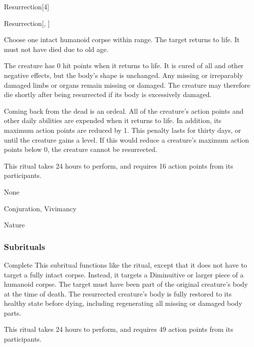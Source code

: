 \begin{spellsection}{Resurrection}[4]


\begin{ability}{Resurrection}[, ]

Choose one intact humanoid corpse within \rngclose range.
The target returns to life.
It must not have died due to old age.

The creature has 0 hit points when it returns to life.
It is cured of all  and other negative effects, but the body's shape is unchanged.
Any missing or irreparably damaged limbs or organs remain missing or damaged.
The creature may therefore die shortly after being resurrected if its body is excessively damaged.

Coming back from the dead is an ordeal.
All of the creature's action points and other daily abilities are expended when it returns to life.
In addition, its maximum action points are reduced by 1.
This penalty lasts for thirty days, or until the creature gains a level.
If this would reduce a creature's maximum action points below 0, the creature cannot be resurrected.

This ritual takes 24 hours to perform, and requires 16 action points from its participants.

\end{ability}


 None

 Conjuration, Vivimancy

 Nature
\end{spellsection}


\subsubsection{Subrituals}


\begin{ability}[\nth{7}]{Complete}
This subritual functions like the  ritual, except that it does not have to target a fully intact corpse.
Instead, it targets a Diminuitive or larger piece of a humanoid corpse.
The target must have been part of the original creature's body at the time of death.
The resurrected creature's body is fully restored to its healthy state before dying, including regenerating all missing or damaged body parts.

This ritual takes 24 hours to perform, and requires 49 action points from its participants.
\end{ability}
\vspace{0.25em}



